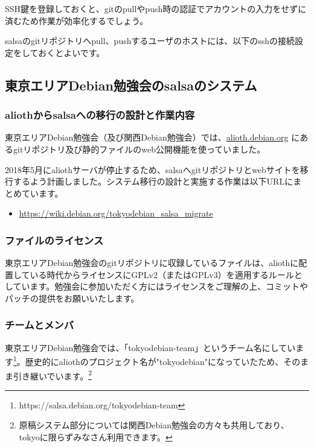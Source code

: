 \documentclass[mingoth,a4paper]{jsarticle}
\begin{document}
SSH鍵を登録しておくと、gitのpullやpush時の認証でアカウントの入力をせずに済むため作業が効率化するでしょう。

salsaのgitリポジトリへpull、pushするユーザのホストには、以下のsshの接続設定をしておくとよいです。



\subsection{東京エリアDebian勉強会のsalsaのシステム}

\subsubsection{aliothからsalsaへの移行の設計と作業内容}

東京エリアDebian勉強会（及び関西Debian勉強会）では、\url{alioth.debian.org} にあるgitリポジトリ及び静的ファイルのweb公開機能を使っていました。

2018年5月にaliothサーバが停止するため、salsaへgitリポジトリとwebサイトを移行するよう計画しました。システム移行の設計と実施する作業は以下URLにまとめています。

\begin{itemize}
  \item \url{https://wiki.debian.org/tokyodebian_salsa_migrate}
\end{itemize}


\subsubsection{ファイルのライセンス}

東京エリアDebian勉強会のgitリポジトリに収録しているファイルは、aliothに配置している時代からライセンスにGPLv2（またはGPLv3）を適用するルールとしています。勉強会に参加いただく方にはライセンスをご理解の上、コミットやパッチの提供をお願いいたします。


\subsubsection{チームとメンバ}

東京エリアDebian勉強会では、「tokyodebian-team」というチーム名にしています\footnote{https://salsa.debian.org/tokyodebian-team}。歴史的にaliothのプロジェクト名が"tokyodebian"になっていたため、そのまま引き継いでいます。\footnote{原稿システム部分については関西Debian勉強会の方々も共用しており、tokyoに限らずみなさん利用できます。}
\end{document}
